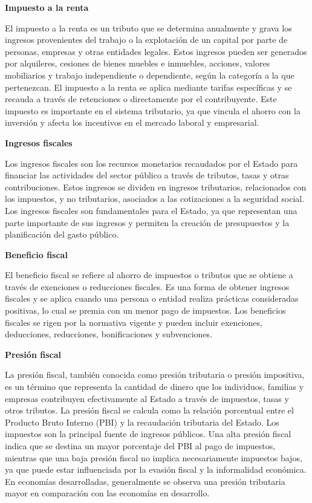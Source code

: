 \documentclass[
  jou,
  floatsintext,
  longtable,
  a4paper,
  nolmodern,
  notxfonts,
  notimes,
  12pt,
  colorlinks=true,linkcolor=blue,citecolor=blue,urlcolor=blue]{apa7}
\begin{document}
\textbf{Impuesto a la renta}

El impuesto a la renta es un tributo que se determina anualmente y grava
los ingresos provenientes del trabajo o la explotación de un capital por
parte de personas, empresas y otras entidades legales. Estos ingresos
pueden ser generados por alquileres, cesiones de bienes muebles e
inmuebles, acciones, valores mobiliarios y trabajo independiente o
dependiente, según la categoría a la que pertenezcan. El impuesto a la
renta se aplica mediante tarifas específicas y se recauda a través de
retenciones o directamente por el contribuyente. Este impuesto es
importante en el sistema tributario, ya que vincula el ahorro con la
inversión y afecta los incentivos en el mercado laboral y empresarial.

\textbf{Ingresos fiscales}

Los ingresos fiscales son los recursos monetarios recaudados por el
Estado para financiar las actividades del sector público a través de
tributos, tasas y otras contribuciones. Estos ingresos se dividen en
ingresos tributarios, relacionados con los impuestos, y no tributarios,
asociados a las cotizaciones a la seguridad social. Los ingresos
fiscales son fundamentales para el Estado, ya que representan una parte
importante de sus ingresos y permiten la creación de presupuestos y la
planificación del gasto público.

\textbf{Beneficio fiscal}

El beneficio fiscal se refiere al ahorro de impuestos o tributos que se
obtiene a través de exenciones o reducciones fiscales. Es una forma de
obtener ingresos fiscales y se aplica cuando una persona o entidad
realiza prácticas consideradas positivas, lo cual se premia con un menor
pago de impuestos. Los beneficios fiscales se rigen por la normativa
vigente y pueden incluir exenciones, deducciones, reducciones,
bonificaciones y subvenciones.

\textbf{Presión fiscal}

La presión fiscal, también conocida como presión tributaria o presión
impositiva, es un término que representa la cantidad de dinero que los
individuos, familias y empresas contribuyen efectivamente al Estado a
través de impuestos, tasas y otros tributos. La presión fiscal se
calcula como la relación porcentual entre el Producto Bruto Interno
(PBI) y la recaudación tributaria del Estado. Los impuestos son la
principal fuente de ingresos públicos. Una alta presión fiscal indica
que se destina un mayor porcentaje del PBI al pago de impuestos,
mientras que una baja presión fiscal no implica necesariamente impuestos
bajos, ya que puede estar influenciada por la evasión fiscal y la
informalidad económica. En economías desarrolladas, generalmente se
observa una presión tributaria mayor en comparación con las economías en
desarrollo.
\end{document}
